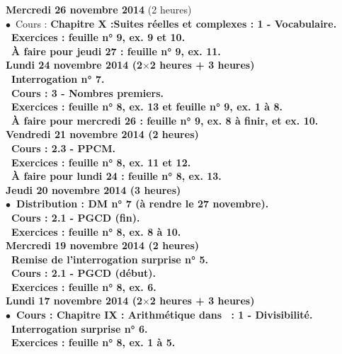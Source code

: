 \documentclass[12pt,a4paper]{article}
\begin{document}
\noindent\textbf{\bf Mercredi 26 novembre 2014 \rm} (2 heures)\\
$\bullet$\ Cours : \bf Chapitre X :\rm Suites réelles et complexes : 1 - Vocabulaire.\\
\bu\ Exercices : feuille n° 9, ex. 9 et 10.\\
\bu\ À faire pour jeudi 27 : feuille n° 9, ex. 11.
\vspace{.4cm}\\
 
\noindent\textbf{ Lundi 24 novembre 2014 \rm} (2$\times$2 heures + 3 heures)\\
\bu\ Interrogation n° 7.\\
\bu\ Cours : 3 - Nombres premiers.\\
\bu\ Exercices : feuille n° 8, ex. 13 et feuille n° 9, ex. 1 à 
8.\\
\bu\ À faire pour mercredi 26 : feuille n° 9, ex. 8 à finir, et ex. 10.\vspace{.4cm}\\
 
\noindent\textbf{ \bf Vendredi 21 novembre 2014 \rm}(2 heures)\\
\bu\ Cours : 2.3 - PPCM.\\
\bu\ Exercices : feuille n° 8, ex. 11 et 12.\\
\bu\ À faire pour lundi 24 : feuille n° 8, ex. 13.\vspace{.4cm}\\

\noindent\textbf{ \bf Jeudi 20 novembre 2014 \rm}(3 heures)\\
$\bullet$\ Distribution : DM n° 7 (à rendre le 27 novembre).\\
\bu\ Cours : 2.1 - PGCD (fin).\\
\bu\ Exercices : feuille n° 8, ex. 8 à 10.\vspace{.4cm}\\
 
\noindent\textbf{\bf Mercredi 19 novembre 2014 \rm} (2 heures)\\
\bu\ Remise de l'interrogation surprise n° 5.\\
\bu\ Cours : 2.1 - PGCD (début).\\
\bu\ Exercices : feuille n° 8, ex. 6.\vspace{.4cm}\\
 
\noindent\textbf{\bf Lundi 17 novembre 2014 \rm} (2$\times$2 heures + 3
heures)\\
$\bullet$\ Cours : \bf Chapitre IX \rm : Arithmétique dans \Z\ : 1 - 
Divisibilité.\\
\bu\ Interrogation surprise n° 6.\\
\bu\ Exercices : feuille n° 8, ex. 1 à 5.\vspace{.4cm}\\
 
\end{document}
